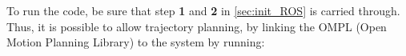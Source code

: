 To run the code, be sure that step \textbf{1} and \textbf{2} in \autoref{sec:init_ROS} is carried through. Thus, it is possible to allow trajectory planning, by linking the OMPL (Open Motion Planning Library) to the system by running: 

